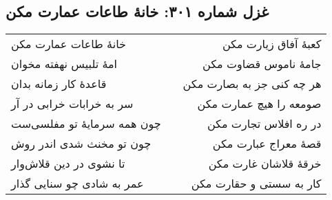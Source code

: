 \begin{center}
\section*{غزل شماره ۳۰۱: خانهٔ طاعات عمارت مکن}
\label{sec:301}
\begin{longtable}{l p{0.5cm} r}
خانهٔ طاعات عمارت مکن
&&
کعبهٔ آفاق زیارت مکن
\\
امهٔ تلبیس نهفته مخوان
&&
جامهٔ ناموس قضاوت مکن
\\
قاعدهٔ کار زمانه بدان
&&
هر چه کنی جز به بصارت مکن
\\
سر به خرابات خرابی در آر
&&
صومعه را هیچ عمارت مکن
\\
چون همه سرمایهٔ تو مفلسی‌ست
&&
در ره افلاس تجارت مکن
\\
چون تو مخنث شدی اندر روش
&&
قصهٔ معراج عبارت مکن
\\
تا نشوی در دین قلاش‌وار
&&
خرقهٔ قلاشان غارت مکن
\\
عمر به شادی چو سنایی گذار
&&
کار به سستی و حقارت مکن
\\
\end{longtable}
\end{center}
